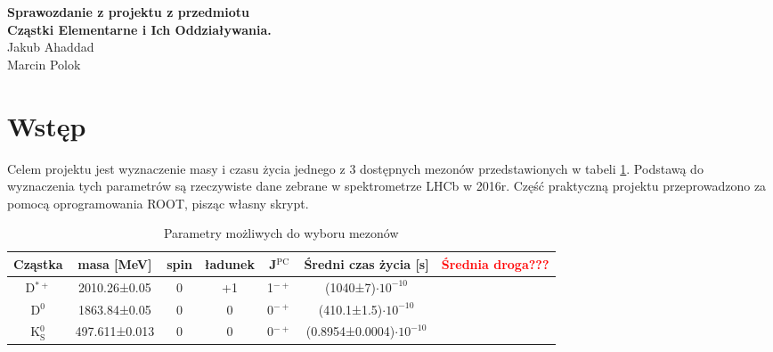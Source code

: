{
	\centering
	{\large\bfseries Sprawozdanie z projektu z przedmiotu \\
	Cząstki Elementarne i Ich Oddziaływania.\\}
	\vspace{1em}
	{
	Jakub Ahaddad\\

	Marcin Polok\\
	}
	\vspace{3em}
}

\section{Wstęp}
Celem projektu jest wyznaczenie masy i czasu życia jednego z 3 dostępnych mezonów przedstawionych w tabeli \ref{tab_mesons}. Podstawą do wyznaczenia tych parametrów
są rzeczywiste dane zebrane w spektrometrze LHCb w 2016r. Część praktyczną projektu przeprowadzono za pomocą
oprogramowania ROOT, pisząc własny skrypt.

\begin{table}[H]
\centering
\caption{Parametry możliwych do wyboru mezonów\cite{database}}
\label{tab_mesons}
\begin{tabular}{ccccccc}

Cząstka		&masa [MeV]	&spin	&ładunek&J$^\text{PC}$	&Średni czas życia [s]		&\textcolor{red}{Średnia droga???} 	\\ \hline

D$^{*+}$	&2010.26±0.05	&0	&+1	&1$^{-+}$	&(1040±7)$\cdot10^{-10}$	&		\\
D$^0$		&1863.84±0.05	&0	&0	&0$^{-+}$	&(410.1±1.5)$\cdot10^{-10}$	&		\\
K$^0_\text{S}$	&497.611±0.013	&0	&0	&0$^{-+}$	&(0.8954±0.0004)$\cdot10^{-10}$	&		\\

\end{tabular}
\end{table}
